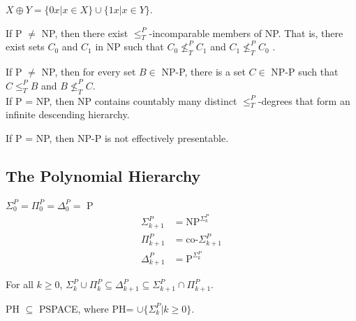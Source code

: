  $X \oplus Y = \{0x | x \in X\} \cup \{1x | x \in
Y\}$.

 If P $\ne$ NP, then there exist $\le^P_T$-incomparable
members of NP. That is, there exist sets $C_0$ and $C_1$ in NP such that 
$C_0 \nleq^P_T C_1$ and $C_1 \nleq^P_T C_0$ .

 If P $\ne$ NP, then for every set $B \in$ NP-P, there is a 
set $C \in$ NP-P such that $C \le^P_T B$ and $B \nleq^P_T C$.\\
If P = NP, then NP contains countably many distinct $\le^P_T$-degrees that form 
an infinite descending hierarchy.

 If P = NP, then NP-P is not effectively presentable.


\subsection{The Polynomial Hierarchy}

 $\Sigma^P_0 = \Pi^P_0 = \Delta^P_0 =$ P
\begin{align*}
  \Sigma^P_{k+1} & = \text{NP}^{\Sigma^P_{k}} \\
  \Pi^P_{k+1} &= \text{co-}\Sigma^P_{k+1} \\
  \Delta^P_{k+1} &= \text{P}^{\Sigma^P_{k}} 
\end{align*}

 For all $k \ge 0$, $\Sigma_k^P \cup \Pi_k^P \subseteq
\Delta_{k+1}^P \subseteq \Sigma_{k+1}^P \cap \Pi_{k+1}^P$.

 PH $\subseteq$ PSPACE, where PH= $\cup \{\Sigma^P_k|k \ge
0\}$.
